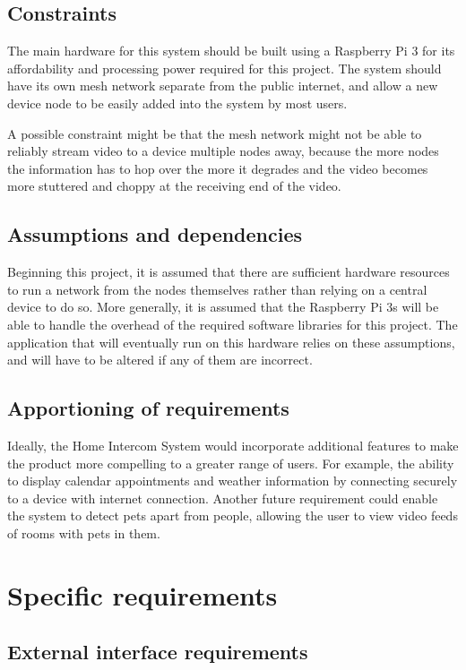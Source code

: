 \documentclass[onecolumn, draftclsnofoot,10pt, compsoc]{IEEEtran}
\begin{document}
\subsection{Constraints}
The main hardware for this system should be built using a Raspberry Pi 3 for its affordability and processing power required for this project. The system should have its own mesh network separate from the public internet, and allow a new device node to be easily added into the system by most users.

\noindent A possible constraint might be that the mesh network might not be able to reliably stream video to a device multiple nodes away, because the more nodes the information has to hop over the more it degrades and the video becomes more stuttered and choppy at the receiving end of the video.

\subsection{Assumptions and dependencies}
Beginning this project, it is assumed that there are sufficient hardware resources to run a network from the nodes themselves rather than relying on a central device to do so. More generally, it is assumed that the Raspberry Pi 3s will be able to handle the overhead of the required software libraries for this project. The application that will eventually run on this hardware relies on these assumptions, and will have to be altered if any of them are incorrect. 

\subsection{Apportioning of requirements}
Ideally, the Home Intercom System would incorporate additional features to make the product more compelling to a greater range of users. For example, the ability to display calendar appointments and weather information by connecting securely to a device with internet connection. Another future requirement could enable the system to detect pets apart from people, allowing the user to view video feeds of rooms with pets in them. 

\section{Specific requirements}

\subsection{External interface requirements}
\end{document}
